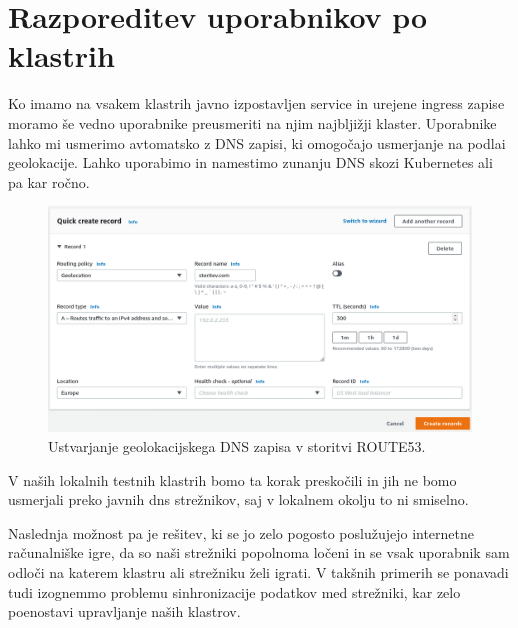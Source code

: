 \documentclass[a4paper, 12pt]{book}
\begin{document}
\section{Razporeditev uporabnikov po klastrih}
Ko imamo na vsakem klastrih javno izpostavljen service in urejene ingress zapise moramo še vedno uporabnike preusmeriti na njim najbljižji klaster.
Uporabnike lahko mi usmerimo avtomatsko z DNS zapisi, ki omogočajo usmerjanje na podlai geolokacije.
Lahko uporabimo in namestimo zunanju DNS skozi Kubernetes ali pa kar ročno.
\begin{figure}[h]
\begin{center}
\includegraphics[width=1.0\textwidth]{images/geolokacijski-dns.png}
\end{center}
\caption{Ustvarjanje geolokacijskega DNS zapisa v storitvi ROUTE53.}
\label{primer-ustvarjanje-geolokacijskega-zapisa}
\end{figure}
V naših lokalnih testnih klastrih bomo ta korak preskočili in jih ne bomo usmerjali preko javnih dns strežnikov, saj v lokalnem okolju to ni smiselno.

Naslednja možnost pa je rešitev, ki se jo zelo pogosto poslužujejo internetne računalniške igre, da so naši strežniki popolnoma ločeni in se vsak uporabnik sam odloči na katerem klastru ali strežniku želi igrati.
V takšnih primerih se ponavadi tudi izognemmo problemu sinhronizacije podatkov med strežniki, kar zelo poenostavi upravljanje naših klastrov.
\end{document}
